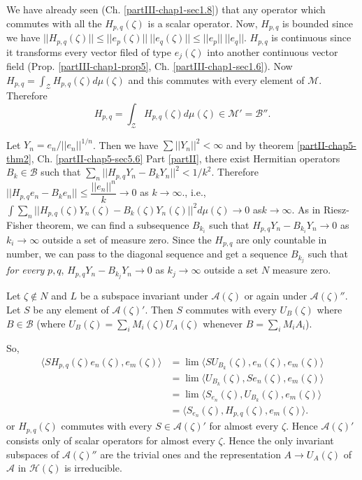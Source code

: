 We have already seen (Ch. \ref{partIII-chap1-sec1.8}) that any
operator which commutes with 
all the $H_{p,q}(\zeta)$ is a scalar operator. Now, $H_{p,q}$ is
bounded since we have $|| H_{p,q} (\zeta)|| \leq || e_p
(\zeta)||~|| e_q (\zeta)|| \leq || e_p ||~ ||e_q ||$. $H_{p,q}$ is
continuous since it transforms every vector filed of type
$e_{j}(\zeta)$ into another continuous vector field
(Prop. \ref{partIII-chap1-prop5}, Ch. \ref{partIII-chap1-sec1.6}). Now
$H_{p,q}=\int_{\mathcal{Z}} H_{p,q}(\zeta) 
d \mu(\zeta)$ and this commutes with every element of
$\mathscr{M}$. Therefore   
$$ 
H_{p,q}=\int_{\mathcal{Z}}H_{p,q} (\zeta)d\mu (\zeta)\in
\mathscr{M}'=\mathscr{B}''. 
$$

Let $Y_n = e_n/|| e_n ||^{1/n}$. Then we have $\sum || Y_n ||^2 <
\infty$ and by theorem \ref{partII-chap5-thm2},
Ch. \ref{partII-chap5-sec5.6} Part \ref{partII}, there exist Hermitian 
operators $B_k \in \mathscr{B}$ such that $\sum_{n}||
H_{p,q}Y_n - B_k Y_n ||^2 < 1/k^2$. Therefore $|| H_{p,q} e_n - B_k
e_n || \leq \dfrac{|| e_n ||^n}{k}\rightarrow 0$ as $k \rightarrow
\infty$., i.e., $\int \sum_{n}|| H_{p,q}(\zeta)Y_n (\zeta)-
B_k (\zeta)Y_{n}(\zeta)||^2 d\mu (\zeta)\rightarrow 0$
as\pageoriginale $k \rightarrow \infty$. As in Riesz-Fisher theorem,
we can find a subsequence 
$B_{k_i}$ such that $H_{p,q} Y_n - B_{k_i} Y_n \rightarrow 0$ as $k_i
\rightarrow \infty$ outside a set of measure zero. Since the $H_{p,q}$
are only countable in number, we can pass to the diagonal sequence and
get a sequence $B_{k_j}$ such that \textit{for every}  $p,q$, $H_{p,q}
Y_n-B_{k_{j}}Y_{n} \rightarrow 0$ as $k_j \rightarrow \infty$ outside
a set $N$ measure zero. 

Let $\zeta \not\in N$ and $L$ be a subspace invariant under
$\mathcal{A}(\zeta)$ or again under $\mathcal{A}(\zeta)''$. Let $S$ be
any element of $\mathcal{A}(\zeta)'$. Then $S$ commutes with every
$U_B (\zeta)$ where $B \in \mathscr{B}$ (where $U_B (\zeta)=
\sum_{i} M_i (\zeta) U_A (\zeta)$ whenever
$B=\sum_{i} M_i A_i$). 

So,
\begin{align*}
\langle SH_{p,q}(\zeta) e_n (\zeta), e_m (\zeta) \rangle & = \lim
\langle SU_{B_k}(\zeta), e_n (\zeta), e_m (\zeta)\rangle\\  
& = \lim \langle U_{B_k}(\zeta), Se_n (\zeta), e_m (\zeta)\rangle \\
& = \lim \langle S_{e_n}(\zeta), U_{B_k} (\zeta), e_m (\zeta)\rangle\\
& = \langle S_{e_n}(\zeta), H_{p,q} (\zeta), e_m (\zeta)\rangle.
\end{align*}
or $H_{p,q}(\zeta)$ commutes with every $S \in \mathcal{A}(\zeta)'$
for almost every $\zeta$. Hence $\mathcal{A}(\zeta)'$ consists only of
scalar  operators for almost every $\zeta$. Hence the only invariant
subspaces of $\mathcal{A}(\zeta)''$ are the trivial ones and the
representation $A \rightarrow U_A (\zeta)$ of  $\mathcal{A}$  in
$\mathscr{H}(\zeta)$  is irreducible. 

